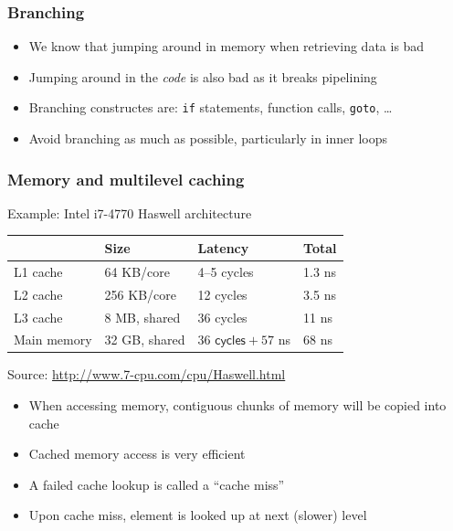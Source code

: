 \documentclass[usenames,dvipsnames,mathserif,compress]{beamer}
\begin{document}
\begin{frame}
  \frametitle{Branching}
  \begin{itemize}
  \item We know that jumping around in memory when retrieving data is bad
  \item Jumping around in the \emph{code} is also bad as it breaks pipelining
  \item Branching constructes are: \texttt{if} statements, function calls, \texttt{goto}, \ldots
  \item Avoid branching as much as possible, particularly in inner loops
  \end{itemize}
\end{frame}


\begin{frame}
  \frametitle{Memory and multilevel caching}
  Example: Intel i7-4770 Haswell architecture\\
  \medskip
  \begin{tabular}{llll}
     & Size & Latency & Total \\
    \hline\hline
    L1 cache & 64 KB/core & 4--5 cycles & 1.3 ns\\
    L2 cache & 256 KB/core & 12 cycles & 3.5 ns \\
    L3 cache & 8 MB, shared & 36 cycles & 11 ns\\
    Main memory & 32 GB, shared & $36\textsf{ cycles} + 57$ ns & 68 ns\\\hline\hline
  \end{tabular}
  Source: \url{http://www.7-cpu.com/cpu/Haswell.html}
  \begin{itemize}
  \item When accessing memory, contiguous chunks of memory will be copied into cache
  \item Cached memory access is very efficient
  \item A failed cache lookup is called a ``cache miss''
  \item Upon cache miss, element is looked up at next (slower) level
  \end{itemize}

\end{frame}
\end{document}
